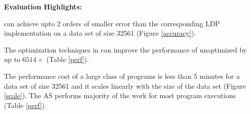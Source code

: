 \textbf{Evaluation Highlights:}
\squishlist \item \system can achieve upto 2 orders of smaller error than the corresponding
\textsf{LDP} implementation on a data set of size 32561 (Figure \ref{accuracy}).
\item The optimization techniques in \system can improve the performance
of unoptimized \system by up to $6514\times$ (Table \ref{perf}).
\item The performance cost of a large class of \system programs is
less than 5 minutes for a data set of size 32561  and it scales linearly with the size of the data set (Figure \ref{scale}). The \textsf{AS} performs majority of the work for most program executions (Table \ref{perf}).
\squishend
